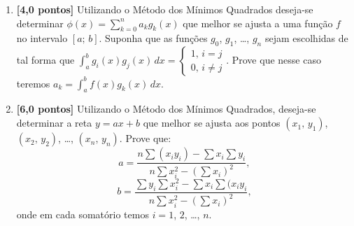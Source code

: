 \documentclass[12pt,a4paper]{article}
\begin{document}
\begin{enumerate}
 \item \textbf{[4,0 pontos]} Utilizando o Método dos Mínimos Quadrados deseja-se determinar $\displaystyle \phi(x) = \sum_{k=0}^n a_kg_k(x)$ que melhor se ajusta 
a uma função $f$ no intervalo $[a;\, b]$. Suponha que as funções $g_0$, $g_1$, \ldots, $g_n$ sejam escolhidas de tal forma que 
$\displaystyle\int_a^b g_i(x)g_j(x)\,dx = \begin{cases}1,\,i = j \\ 0,\,i\neq j\end{cases}$. Prove que nesse caso teremos 
$a_k = \displaystyle\int_a^b f(x)g_k(x)\,dx$.

  \item \textbf{[6,0 pontos]} Utilizando o Método dos Mínimos Quadrados, deseja-se determinar a reta $y = ax + b$ que 
melhor se ajusta aos pontos $(x_1,\,y_1)$, $(x_2,\,y_2)$, \ldots, $(x_n,\,y_n)$. Prove que:
$$a = \dfrac{\displaystyle n\sum (x_iy_i) - \sum x_i\sum y_i}{\displaystyle n\sum x_i^2 - \left(\sum x_i\right)^2},$$
$$b = \dfrac{\displaystyle \sum y_i\sum x_i^2 - \sum x_i\sum (x_iy_i}{\displaystyle n\sum x_i^2 - \left(\sum x_i\right)^2},$$
onde em cada somatório temos $i = 1$, $2$, \ldots, $n$.
\end{enumerate}
\end{document}
